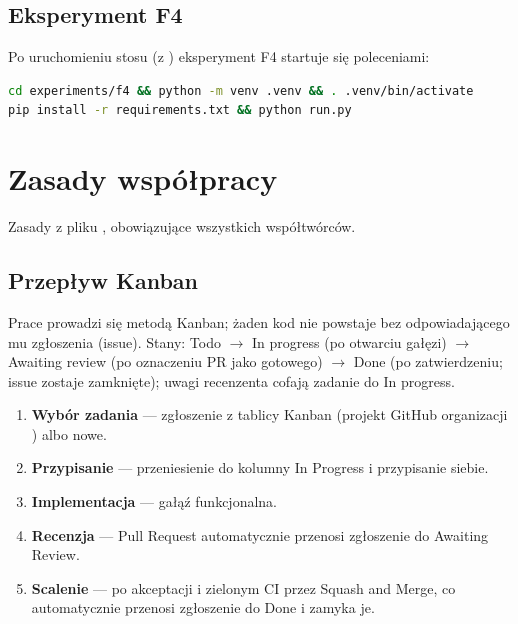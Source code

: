 \section{Eksperyment F4}
\label{sec:zal-f4}

Po uruchomieniu stosu (z ) eksperyment F4 startuje się poleceniami:

\begin{lstlisting}[language=bash]
cd experiments/f4 && python -m venv .venv && . .venv/bin/activate
pip install -r requirements.txt && python run.py
\end{lstlisting}

\chapter{Zasady współpracy}
\label{ch:zal-wspolpraca}

Zasady z pliku , obowiązujące wszystkich współtwórców.

\section{Przepływ Kanban}
\label{sec:zal-kanban}

Prace prowadzi się metodą Kanban; żaden kod nie powstaje bez odpowiadającego mu
zgłoszenia (issue). Stany: Todo $\rightarrow$ In progress (po otwarciu gałęzi)
$\rightarrow$ Awaiting review (po oznaczeniu PR jako gotowego) $\rightarrow$ Done (po
zatwierdzeniu; issue zostaje zamknięte); uwagi recenzenta cofają zadanie do In progress.

\begin{enumerate}
  \item \textbf{Wybór zadania} --- zgłoszenie z tablicy Kanban (projekt GitHub organizacji ) albo nowe.
  \item \textbf{Przypisanie} --- przeniesienie do kolumny In Progress i przypisanie siebie.
  \item \textbf{Implementacja} --- gałąź funkcjonalna.
  \item \textbf{Recenzja} --- Pull Request automatycznie przenosi zgłoszenie do Awaiting Review.
  \item \textbf{Scalenie} --- po akceptacji i zielonym CI przez Squash and Merge, co automatycznie przenosi zgłoszenie do Done i zamyka je.
\end{enumerate}

